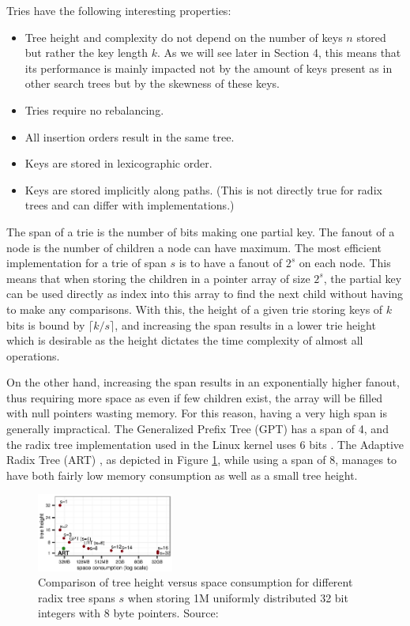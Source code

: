 \documentclass[acmtog, nonacm]{acmart}
\begin{document}
Tries have the following interesting properties:
\begin{itemize}
    \item Tree height and complexity do not depend on the number of keys $n$ stored but rather
    the key length $k$. As we will see later in Section 4, this means that its performance is mainly impacted not by
    the amount of keys present as in other search trees but by the skewness of these keys.
    \item Tries require no rebalancing.
    \item All insertion orders result in the same tree.
    \item Keys are stored in lexicographic order.
    \item Keys are stored implicitly along paths. (This is not directly true for radix trees and can differ with implementations.)
\end{itemize}

The span of a trie is the number of bits making one partial key. The fanout of a node is the number of children 
a node can have maximum. The most efficient implementation for a trie of span $s$ is to have a fanout of $2^s$ on 
each node. This means that when storing the children in a pointer array of size $2^s$, the partial key can be used 
directly as index into this array to find the next child without having to make any comparisons.
With this, the height of a given trie storing keys of $k$ bits is bound by $\lceil k/s\rceil$, and increasing 
the span results in a lower trie height which is desirable as the height dictates the time complexity of almost 
all operations.

On the other hand, increasing the span results in an exponentially higher fanout, thus requiring more space as even 
if few children exist, the array will be filled with null pointers wasting memory. 
For this reason, having a very high span is generally impractical. The Generalized Prefix Tree (GPT) \cite{mci/Boehm2011} 
has a span of 4, and the radix tree implementation used in the Linux kernel uses 6 bits \cite{corbet2006lrt}. 
The Adaptive Radix Tree (ART) \cite{6544812}, as depicted in Figure \ref{fig:trie-mem}, while using a span of 8, manages to have both 
fairly low memory consumption as well as a small tree height.

\begin{figure}
    \centering
    \includegraphics[width=0.4\textwidth]{images/02-trie-memory-consumption.png}
    \caption{Comparison of tree height versus space consumption for different radix tree spans $s$ when storing 1M uniformly distributed 32 bit integers with 8 byte pointers.
    Source: \cite{6544812}}
    \label{fig:trie-mem}
\end{figure}
\end{document}
